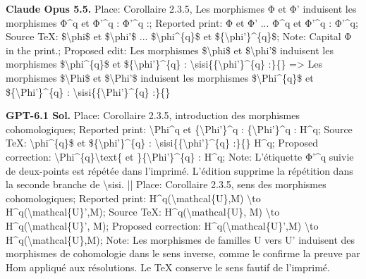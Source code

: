 \textbf{Claude Opus 5.5.} Place: Corollaire 2.3.5, Les morphismes Φ et Φ' induisent les morphismes Φ\textasciicircum{}q et Φ'\textasciicircum{}q : Φ'\textasciicircum{}q :; Reported print: Φ et Φ' ... Φ\textasciicircum{}q et Φ'\textasciicircum{}q : Φ'\textasciicircum{}q; Source TeX: \$\textbackslash{}phi\$ et \$\textbackslash{}phi'\$ ... \$\textbackslash{}phi\textasciicircum{}\{q\}\$ et \$\{\textbackslash{}phi'\}\textasciicircum{}\{q\}\$; Note: Capital Φ in the print.; Proposed edit: Les morphismes \$\textbackslash{}phi\$ et \$\textbackslash{}phi'\$ induisent les   morphismes \$\textbackslash{}phi\textasciicircum{}\{q\}\$ et \$\{\textbackslash{}phi'\}\textasciicircum{}\{q\} : \textbackslash{}sisi\{\{\textbackslash{}phi'\}\textasciicircum{}\{q\} :\}\{\} =\allowbreak > Les morphismes \$\textbackslash{}Phi\$ et \$\textbackslash{}Phi'\$ induisent les   morphismes \$\textbackslash{}Phi\textasciicircum{}\{q\}\$ et \$\{\textbackslash{}Phi'\}\textasciicircum{}\{q\} : \textbackslash{}sisi\{\{\textbackslash{}Phi'\}\textasciicircum{}\{q\} :\}\{\}\par
\textbf{GPT-6.1 Sol.} Place: Corollaire 2.3.5, introduction des morphismes cohomologiques; Reported print: \textbackslash{}Phi\textasciicircum{}q et \{\textbackslash{}Phi'\}\textasciicircum{}q : \{\textbackslash{}Phi'\}\textasciicircum{}q : H\textasciicircum{}q; Source TeX: \textbackslash{}phi\textasciicircum{}\{q\}\$ et \$\{\textbackslash{}phi'\}\textasciicircum{}\{q\} : \textbackslash{}sisi\{\{\textbackslash{}phi'\}\textasciicircum{}\{q\} :\}\{\} H\textasciicircum{}q; Proposed correction: \textbackslash{}Phi\textasciicircum{}\{q\}\textbackslash{}text\{ et \}\{\textbackslash{}Phi'\}\textasciicircum{}\{q\} : H\textasciicircum{}q; Note: L'étiquette Φ'\textasciicircum{}q suivie de deux-points est répétée dans l'imprimé. L'édition supprime la répétition dans la seconde branche de \textbackslash{}sisi. || Place: Corollaire 2.3.5, sens des morphismes cohomologiques; Reported print: H\textasciicircum{}q(\textbackslash{}mathcal\{U\},M) \textbackslash{}to H\textasciicircum{}q(\textbackslash{}mathcal\{U\}',M); Source TeX: H\textasciicircum{}q(\textbackslash{}mathcal\{U\},   M) \textbackslash{}to H\textasciicircum{}q(\textbackslash{}mathcal\{U\}', M); Proposed correction: H\textasciicircum{}q(\textbackslash{}mathcal\{U\}',M) \textbackslash{}to H\textasciicircum{}q(\textbackslash{}mathcal\{U\},M); Note: Les morphismes de familles U vers U' induisent des morphismes de cohomologie dans le sens inverse, comme le confirme la preuve par Hom appliqué aux résolutions. Le TeX conserve le sens fautif de l'imprimé.\par
